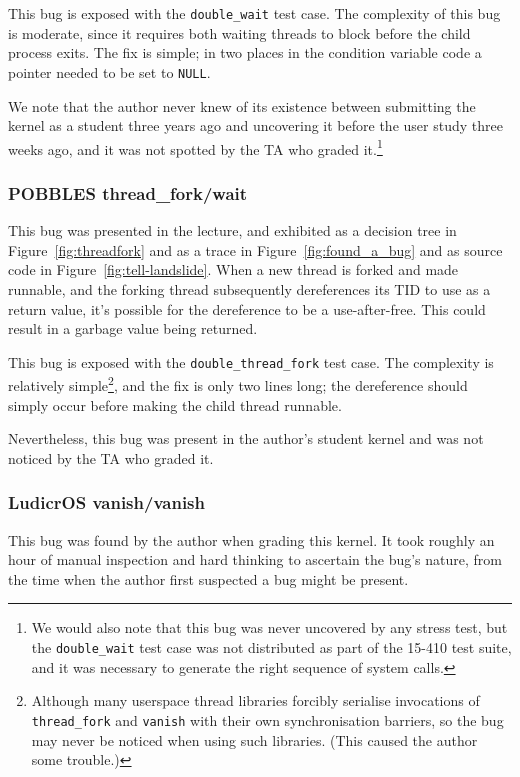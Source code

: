 This bug is exposed with the \texttt{double\_wait} test case.
The complexity of this bug is moderate, since it requires both waiting threads to block before the child process exits.
The fix is simple; in two places in the condition variable code a pointer needed to be set to \texttt{NULL}.

We note that the author never knew of its existence between submitting the kernel as a student three years ago and uncovering it before the user study three weeks ago, and it was not spotted by the TA who graded it.\footnote{
We would also note that this bug was never uncovered by any stress test, but the \texttt{double\_wait} test case was not distributed as part of the 15-410 test suite, and it was necessary to generate the right sequence of system calls.}

\subsubsection{POBBLES thread\_fork/wait}
\label{sec:eval-thread-fork}

This bug was presented in the lecture, and exhibited as a decision tree in Figure~\ref{fig:threadfork} and as a trace in Figure~\ref{fig:found_a_bug} and as source code in Figure~\ref{fig:tell-landslide}. When a new thread is forked and made runnable, and the forking thread subsequently dereferences its TID to use as a return value, it's possible for the dereference to be a use-after-free. This could result in a garbage value being returned.

This bug is exposed with the \texttt{double\_thread\_fork} test case. The complexity is relatively simple\footnote{
Although many userspace thread libraries forcibly serialise invocations of \texttt{thread\_fork} and \texttt{vanish} with their own synchronisation barriers, so the bug may never be noticed when using such libraries. (This caused the author some trouble.)},
and the fix is only two lines long; the dereference should simply occur before making the child thread runnable.

Nevertheless, this bug was present in the author's student kernel and was not noticed by the TA who graded it.

\subsubsection{LudicrOS vanish/vanish}
\label{sec:eval-ludicros-vanish}

This bug was found by the author when grading this kernel. It took roughly an hour of manual inspection and hard thinking to ascertain the bug's nature, from the time when the author first suspected a bug might be present.

